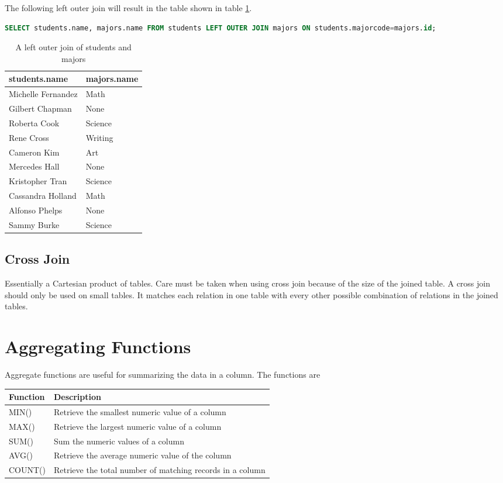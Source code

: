 The following left outer join will result in the table shown in table \ref{table:lo_studentsmajors}.
\begin{lstlisting}[language=SQL]
SELECT students.name, majors.name FROM students LEFT OUTER JOIN majors ON students.majorcode=majors.id;
\end{lstlisting}
\begin{table}
\begin{tabular}{|l|l|}
\hline
students.name & majors.name \\
\hline
Michelle Fernandez & Math \\
Gilbert Chapman & None \\
Roberta Cook & Science \\
Rene Cross & Writing \\
Cameron Kim & Art \\
Mercedes Hall & None \\
Kristopher Tran & Science \\
Cassandra Holland & Math \\
Alfonso Phelps & None \\
Sammy Burke & Science \\
\hline
\end{tabular}
\caption{A left outer join of students and majors}
\label{table:lo_studentsmajors}
\end{table}

\subsection*{Cross Join}
Essentially a Cartesian product of tables.  
Care must be taken when using cross join because of the size of the joined table.
A cross join should only be used on small tables.
It matches each relation in one table with every other possible combination of relations in the joined tables.

\section*{Aggregating Functions}
Aggregate functions are useful for summarizing the data in a column.
The functions are
\begin{table}
\begin{tabular}{|l|l|}
\hline
Function & Description \\
\hline
MIN() & Retrieve the smallest numeric value of a column \\
MAX()& Retrieve the largest numeric value of a column \\
SUM() & Sum the numeric values of a column \\
AVG() & Retrieve the average numeric value of the column \\
COUNT() & Retrieve the total number of matching records in a column\\
\hline
\end{tabular}
\end{table}

